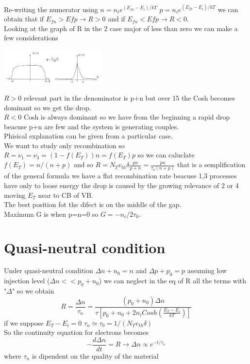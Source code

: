 Re-writing the numerator using $n=n_ie^{(E_{fn}-E_i)/kT}$ $p=n_ie^{(E_{fp}-E_i)/kT}$ we can obtain that if $E_{fn}>E{fp}\rightarrow R>0$ and if $E_{fn}<E{fp}\rightarrow R<0$.\\
\vspace{5mm}
Looking at the graph of R in the 2 case major of less than zero we can make a few considerations

\centering
\includegraphics[width=0.4\textwidth]{RG.png}\\
\raggedright

\tab $R>0$ relevant part in the denominator is p+n but over 15 the Cosh becomes dominant so we get the drop.\\
\tab $R<0$ Cosh is always dominant so we have from the beginning a rapid drop beacuse p+n are few and the system is generating couples.\\
\vspace{5mm}
Phisical explanation can be given from a particular case.\\
We want to study only recombination so $R=\nu_1=\nu_3=(1-f(E_T))n=f(E_T)p$ so we can caluclate $f(E_T)=n/(n+p)$ and so $R=N_Tv_{th}\delta \frac{pn}{p+n}=\frac{pn}{\tau_0(n+p)}$ that is a semplification of the general formula we have a flat recombination rate beacuse 1,3 processes have only to loose energy the drop is caused by the growing relevance of 2 or 4 moving $E_T$ near to CB of VB.\\
The best position fot the difect is on the middle of the gap.\\
Maximum G is when p=n=0 so $G=-n_i/2\tau_0$.\\


\section{Quasi-neutral condition}
Under quasi-neutral condition $\Delta n +n_0=n$ and $\Delta p +p_0=p$ assuming low injection level ($\Delta n<<p_0+n_0$) we can neglect in the eq of R all the terms with "$\Delta$" so we obtain
\begin{equation}
R=\frac{\Delta n}{\tau_n}=\frac{(p_0+n_0)\Delta n}{\tau\left[p_0+n_0+2n_iCosh(\frac{E_T-E_i}{kT})\right]}
\end{equation}
if we suppose $E_T-E_i=0$ $\tau_n\simeq \tau_0=1/(N_Tv_{th}\delta)$\\
So the continuity equation for electrons becomes
\begin{equation}
-\frac{d\Delta n}{dt}=R \rightarrow \Delta n \propto e^{-t/\tau_n}
\end{equation} 
where $\tau_n$ is dipendent on the quality of the material

